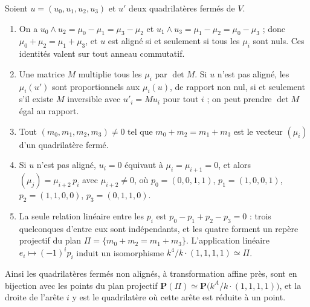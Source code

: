 \begin{encadre}
\begin{theoreme}\label{thm:73-quadrilatere}
Soient $u = (u_0, u_1, u_2, u_3)$ et $u'$ deux quadrilatères fermés de $V$.
\begin{enumerate}
\item On a $u_0 \wedge u_2 = \mu_0 - \mu_1 = \mu_3 - \mu_2$ et $u_1 \wedge u_3 = \mu_1 - \mu_2 = \mu_0 - \mu_3$ ; donc $\mu_0 + \mu_2 = \mu_1 + \mu_3$, et $u$ est aligné si et seulement si tous les $\mu_i$ sont nuls. Ces identités valent sur tout anneau commutatif.
\item Une matrice $M$ multiplie tous les $\mu_i$ par $\det M$. Si $u$ n'est pas aligné, les $\mu_i(u')$ sont proportionnels aux $\mu_i(u)$, de rapport non nul, si et seulement s'il existe $M$ inversible avec $u'_i = Mu_i$ pour tout $i$ ; on peut prendre $\det M$ égal au rapport.
\item Tout $(m_0, m_1, m_2, m_3) \neq 0$ tel que $m_0 + m_2 = m_1 + m_3$ est le vecteur $(\mu_i)$ d'un quadrilatère fermé.
\item Si $u$ n'est pas aligné, $u_i = 0$ équivaut à $\mu_i = \mu_{i+1} = 0$, et alors $(\mu_j) = \mu_{i+2}\, p_i$ avec $\mu_{i+2} \neq 0$, où $p_0 = (0,0,1,1)$, $p_1 = (1,0,0,1)$, $p_2 = (1,1,0,0)$, $p_3 = (0,1,1,0)$.
\item La seule relation linéaire entre les $p_i$ est $p_0 - p_1 + p_2 - p_3 = 0$ : trois quelconques d'entre eux sont indépendants, et les quatre forment un repère projectif du plan $\Pi = \{m_0 + m_2 = m_1 + m_3\}$. L'application linéaire $e_i \mapsto (-1)^i p_i$ induit un isomorphisme $k^4 / k\cdot(1,1,1,1) \simeq \Pi$.
\end{enumerate}
Ainsi les quadrilatères fermés non alignés, à transformation affine près, sont en bijection avec les points du plan projectif $\mathbf{P}(\Pi) \simeq \mathbf{P}\bigl(k^A / k\cdot(1,1,1,1)\bigr)$, et la droite de l'arête $i$ y est le quadrilatère où cette arête est réduite à un point.
\end{theoreme}
\end{encadre}

